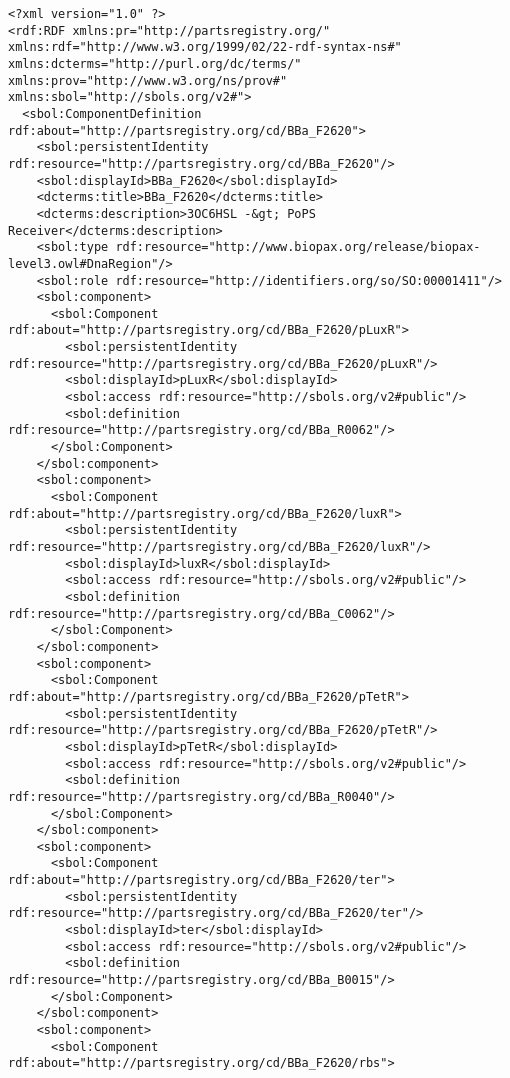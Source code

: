 \label{ser:F2620}
\begin{lstlisting}
<?xml version="1.0" ?>
<rdf:RDF xmlns:pr="http://partsregistry.org/" xmlns:rdf="http://www.w3.org/1999/02/22-rdf-syntax-ns#" xmlns:dcterms="http://purl.org/dc/terms/" xmlns:prov="http://www.w3.org/ns/prov#" xmlns:sbol="http://sbols.org/v2#">
  <sbol:ComponentDefinition rdf:about="http://partsregistry.org/cd/BBa_F2620">
    <sbol:persistentIdentity rdf:resource="http://partsregistry.org/cd/BBa_F2620"/>
    <sbol:displayId>BBa_F2620</sbol:displayId>
    <dcterms:title>BBa_F2620</dcterms:title>
    <dcterms:description>3OC6HSL -&gt; PoPS Receiver</dcterms:description>
    <sbol:type rdf:resource="http://www.biopax.org/release/biopax-level3.owl#DnaRegion"/>
    <sbol:role rdf:resource="http://identifiers.org/so/SO:00001411"/>
    <sbol:component>
      <sbol:Component rdf:about="http://partsregistry.org/cd/BBa_F2620/pLuxR">
        <sbol:persistentIdentity rdf:resource="http://partsregistry.org/cd/BBa_F2620/pLuxR"/>
        <sbol:displayId>pLuxR</sbol:displayId>
        <sbol:access rdf:resource="http://sbols.org/v2#public"/>
        <sbol:definition rdf:resource="http://partsregistry.org/cd/BBa_R0062"/>
      </sbol:Component>
    </sbol:component>
    <sbol:component>
      <sbol:Component rdf:about="http://partsregistry.org/cd/BBa_F2620/luxR">
        <sbol:persistentIdentity rdf:resource="http://partsregistry.org/cd/BBa_F2620/luxR"/>
        <sbol:displayId>luxR</sbol:displayId>
        <sbol:access rdf:resource="http://sbols.org/v2#public"/>
        <sbol:definition rdf:resource="http://partsregistry.org/cd/BBa_C0062"/>
      </sbol:Component>
    </sbol:component>
    <sbol:component>
      <sbol:Component rdf:about="http://partsregistry.org/cd/BBa_F2620/pTetR">
        <sbol:persistentIdentity rdf:resource="http://partsregistry.org/cd/BBa_F2620/pTetR"/>
        <sbol:displayId>pTetR</sbol:displayId>
        <sbol:access rdf:resource="http://sbols.org/v2#public"/>
        <sbol:definition rdf:resource="http://partsregistry.org/cd/BBa_R0040"/>
      </sbol:Component>
    </sbol:component>
    <sbol:component>
      <sbol:Component rdf:about="http://partsregistry.org/cd/BBa_F2620/ter">
        <sbol:persistentIdentity rdf:resource="http://partsregistry.org/cd/BBa_F2620/ter"/>
        <sbol:displayId>ter</sbol:displayId>
        <sbol:access rdf:resource="http://sbols.org/v2#public"/>
        <sbol:definition rdf:resource="http://partsregistry.org/cd/BBa_B0015"/>
      </sbol:Component>
    </sbol:component>
    <sbol:component>
      <sbol:Component rdf:about="http://partsregistry.org/cd/BBa_F2620/rbs">

\end{lstlisting}
